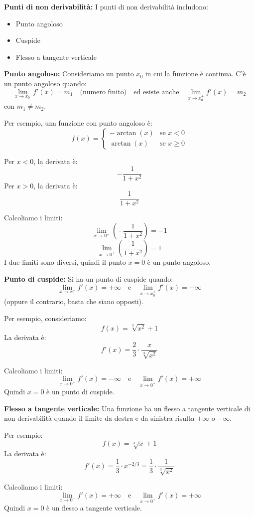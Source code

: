 \documentclass[12pt]{article}
\begin{document}
\Huge

\textbf{Punti di non derivabilità:}  
I punti di non derivabilità includono:  
\begin{itemize}
    \item Punto angoloso
    \item Cuspide
    \item Flesso a tangente verticale
\end{itemize}

\vspace{0.5cm}

\textbf{Punto angoloso:}  
Consideriamo un punto \( x_0 \) in cui la funzione è continua.  
C'è un punto angoloso quando:  
\[
\lim_{x \to x_0^-} f'(x) = m_1 \quad \text{(numero finito)} \quad \text{ed esiste anche} \quad \lim_{x \to x_0^+} f'(x) = m_2
\]
con \( m_1 \neq m_2 \).

Per esempio, una funzione con punto angoloso è:  
\[
f(x) = 
\begin{cases} 
-\arctan(x) & \text{se } x < 0 \\ 
\arctan(x) & \text{se } x \geq 0
\end{cases}
\]

Per \( x < 0 \), la derivata è:  
\[
-\frac{1}{1 + x^2}
\]
Per \( x > 0 \), la derivata è:  
\[
\frac{1}{1 + x^2}
\]

Calcoliamo i limiti:  
\[
\lim_{x \to 0^-} \left( -\frac{1}{1 + x^2} \right) = -1
\]
\[
\lim_{x \to 0^+} \left( \frac{1}{1 + x^2} \right) = 1
\]
I due limiti sono diversi, quindi il punto \( x = 0 \) è un punto angoloso.

\vspace{0.5cm}

\textbf{Punto di cuspide:}  
Si ha un punto di cuspide quando:  
\[
\lim_{x \to x_0^-} f'(x) = +\infty \quad \text{e} \quad \lim_{x \to x_0^+} f'(x) = -\infty
\]
(oppure il contrario, basta che siano opposti).

Per esempio, consideriamo:
\[
f(x) = \sqrt[3]{x^2} + 1
\]
La derivata è:
\[
f'(x) = \frac{2}{3} \cdot \frac{x}{\sqrt[3]{x^2}}
\]

Calcoliamo i limiti:  
\[
\lim_{x \to 0^-} f'(x) = -\infty \quad \text{e} \quad \lim_{x \to 0^+} f'(x) = +\infty
\]
Quindi \( x = 0 \) è un punto di cuspide.

\vspace{0.5cm}

\textbf{Flesso a tangente verticale:}  
Una funzione ha un flesso a tangente verticale di non derivabilità quando il limite da destra e da sinistra risulta \( +\infty \) o \( -\infty \).

Per esempio:
\[
f(x) = \sqrt[3]{x} + 1
\]
La derivata è:  
\[
f'(x) = \frac{1}{3} \cdot x^{-2/3} = \frac{1}{3} \cdot \frac{1}{\sqrt[3]{x^2}}
\]

Calcoliamo i limiti:
\[
\lim_{x \to 0^-} f'(x) = +\infty \quad \text{e} \quad \lim_{x \to 0^+} f'(x) = +\infty
\]
Quindi \( x = 0 \) è un flesso a tangente verticale.
\end{document}
